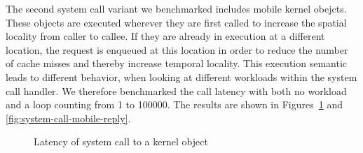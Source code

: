 The second system call variant we benchmarked includes mobile kernel obejcts. These objects are executed wherever they are first called to increase the spatial locality from caller to callee. If they are already in execution at a different location, the request is enqueued at this location in order to reduce the number of cache misses and thereby increase temporal locality. This execution semantic leads to different behavior, when looking at different workloads within the system call handler. We therefore benchmarked the call latency with both no workload and a loop counting from \num{1} to \num{100000}. The results are shown in Figures~\ref{fig:system-call-mobile-return} and \ref{fig:system-call-mobile-reply}.

\begin{figure}[ht!]
  \begin{center}
    \caption{Latency of system call to a kernel object}
    \label{fig:system-call-mobile-return}
  \end{center}
\end{figure}

